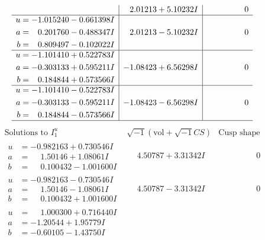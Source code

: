 \documentclass[1p]{elsarticle_modified}
\theoremstyle{definition}
\newcommand{\I}{\sqrt{-1}}
\begin{document}
$$\begin{array}{c|c|c}
 & \phantom{-}2.01213 + 5.10232 I & \phantom{-0.000000 } 0 \\ \hline\begin{aligned}
u &= -1.015240 - 0.661398 I \\
a &= \phantom{-}0.201760 - 0.488347 I \\
b &= \phantom{-}0.809497 - 0.102022 I\end{aligned}
 & \phantom{-}2.01213 - 5.10232 I & \phantom{-0.000000 } 0 \\ \hline\begin{aligned}
u &= -1.101410 + 0.522783 I \\
a &= -0.303133 + 0.595211 I \\
b &= \phantom{-}0.184844 + 0.573566 I\end{aligned}
 & -1.08423 + 6.56298 I & \phantom{-0.000000 } 0 \\ \hline\begin{aligned}
u &= -1.101410 - 0.522783 I \\
a &= -0.303133 - 0.595211 I \\
b &= \phantom{-}0.184844 - 0.573566 I\end{aligned}
 & -1.08423 - 6.56298 I & \phantom{-0.000000 } 0\\
 \hline 
 \end{array}$$\newpage$$\begin{array}{c|c|c}  
\text{Solutions to }I^u_{1}& \I (\text{vol} + \sqrt{-1}CS) & \text{Cusp shape}\\
 \hline 
\begin{aligned}
u &= -0.982163 + 0.730546 I \\
a &= \phantom{-}1.50146 + 1.08061 I \\
b &= \phantom{-}0.100432 - 1.001600 I\end{aligned}
 & \phantom{-}4.50787 + 3.31342 I & \phantom{-0.000000 } 0 \\ \hline\begin{aligned}
u &= -0.982163 - 0.730546 I \\
a &= \phantom{-}1.50146 - 1.08061 I \\
b &= \phantom{-}0.100432 + 1.001600 I\end{aligned}
 & \phantom{-}4.50787 - 3.31342 I & \phantom{-0.000000 } 0 \\ \hline\begin{aligned}
u &= \phantom{-}1.000300 + 0.716440 I \\
a &= -1.20544 + 1.95779 I \\
b &= -0.60105 - 1.43750 I\end{aligned}

\end{array}$$
\end{document}
